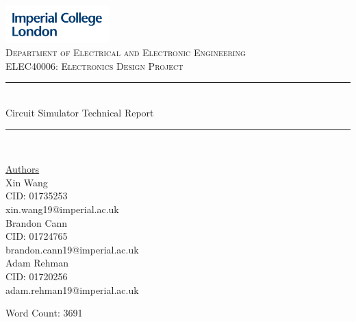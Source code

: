 \documentclass[12pt,a4paper]{article}
\begin{document}
\begin{titlepage}
	\newcommand{\HRule}{\rule{\linewidth}{0.5mm}}
    \includegraphics[width = 4cm]{./Images/Logo.jpg}\\[0.5cm] 
    
    \center 
	\textsc{\large Department of Electrical and Electronic Engineering }\\[0.5cm] 
	\textsc{\normalsize ELEC40006: Electronics Design Project}\\[0.5cm] 
    
	\HRule \\[0.4cm]
	Circuit Simulator Technical Report
    \HRule \\[1.5cm]
     
    \begin{center}
		\underline{Authors}\\[0.5cm] Xin Wang\\CID: 01735253\\xin.wang19@imperial.ac.uk \\[0.5cm]
		Brandon Cann\\ CID: 01724765\\ brandon.cann19@imperial.ac.uk\\[0.5cm]
		Adam Rehman\\ CID: 01720256\\adam.rehman19@imperial.ac.uk\\[0.5cm]
	\end{center} \large
    
    \vfill %
 	\small Word Count: 3691 \\ [0.5cm]
    \makeatletter
    \@date 
    \makeatother
\end{titlepage}

\tableofcontents
\pagebreak
\end{document}
